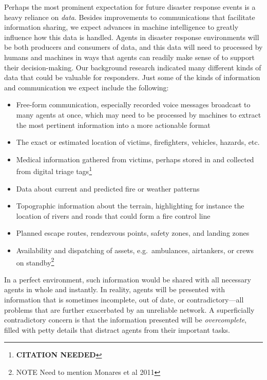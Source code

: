 \documentclass[]             %
{NASA}                       %
\theoremstyle{definition}
\newcommand{\citationneeded}{\footnote{\textbf{CITATION NEEDED}}}
\providecommand{\tightlist}{%
  \setlength{\itemsep}{0pt}\setlength{\parskip}{0pt}}
\begin{document}
Perhaps the most prominent expectation for future disaster response
events is a heavy reliance on \emph{data}. Besides improvements to
communications that facilitate information sharing, we expect advances
in machine intelligence to greatly influence how this data is
handled. Agents in disaster response environments will be both
producers and consumers of data, and this data will need to processed
by humans and machines in ways that agents can readily make sense of
to support their decision-making. Our background research indicated
many different kinds of data that could be valuable for
responders. Just some of the kinds of information and communication we
expect include the following:
\begin{itemize}
  \tightlist
\item
  Free-form communication, especially recorded voice messages
  broadcast to many agents at once, which may need to be processed by
  machines to extract the most pertinent information into a more
  actionable format
\item
  The exact or estimated location of victims, firefighters, vehicles,
  hazards, etc.
\item
  Medical information gathered from victims, perhaps stored in and
  collected from digital triage tags\citationneeded
\item
  Data about current and predicted fire or weather patterns
\item
  Topographic information about the terrain, highlighting for instance
  the location of rivers and roads that could form a fire control line
\item
  Planned escape routes, rendezvous points, safety zones, and landing
  zones
\item
  Availability and dispatching of assets, e.g.~ambulances, airtankers,
  or crews on standby\footnote{NOTE Need to mention Monares et al 2011}
\end{itemize}
In a perfect environment, such information would be shared with all
necessary agents in whole and instantly. In reality, agents will be
presented with information that is sometimes incomplete, out of date,
or contradictory---all problems that are further exacerbated by an
unreliable network. A superficially contradictory concern is that the
information presented will be \emph{overcomplete}, filled with petty
details that distract agents from their important tasks.

\end{document}
